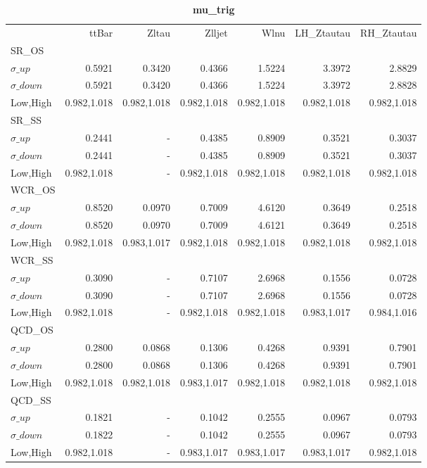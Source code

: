 \documentclass[11pt,oneside,a4paper]{article}
\begin{document}
\begin{table}
\caption{\bf{mu\_trig}}
\centering
\begin{tabular}{lrrrrrr}
& ttBar & Zltau & Zlljet & Wlnu & LH\_Ztautau & RH\_Ztautau \\
SR\_OS &  &  &  &  &  &  \\
$\sigma\_up$ & 0.5921 & 0.3420 & 0.4366 & 1.5224 & 3.3972 & 2.8829 \\
$\sigma\_down$ & 0.5921 & 0.3420 & 0.4366 & 1.5224 & 3.3972 & 2.8828 \\
Low,High & 0.982,1.018 & 0.982,1.018 & 0.982,1.018 & 0.982,1.018 & 0.982,1.018 & 0.982,1.018 \\

\hline
SR\_SS &  &  &  &  &  &  \\
$\sigma\_up$ & 0.2441 & - & 0.4385 & 0.8909 & 0.3521 & 0.3037 \\
$\sigma\_down$ & 0.2441 & - & 0.4385 & 0.8909 & 0.3521 & 0.3037 \\
Low,High & 0.982,1.018 & - & 0.982,1.018 & 0.982,1.018 & 0.982,1.018 & 0.982,1.018 \\

\hline
WCR\_OS &  &  &  &  &  &  \\
$\sigma\_up$ & 0.8520 & 0.0970 & 0.7009 & 4.6120 & 0.3649 & 0.2518 \\
$\sigma\_down$ & 0.8520 & 0.0970 & 0.7009 & 4.6121 & 0.3649 & 0.2518 \\
Low,High & 0.982,1.018 & 0.983,1.017 & 0.982,1.018 & 0.982,1.018 & 0.982,1.018 & 0.982,1.018 \\

\hline
WCR\_SS &  &  &  &  &  &  \\
$\sigma\_up$ & 0.3090 & - & 0.7107 & 2.6968 & 0.1556 & 0.0728 \\
$\sigma\_down$ & 0.3090 & - & 0.7107 & 2.6968 & 0.1556 & 0.0728 \\
Low,High & 0.982,1.018 & - & 0.982,1.018 & 0.982,1.018 & 0.983,1.017 & 0.984,1.016 \\

\hline
QCD\_OS &  &  &  &  &  &  \\
$\sigma\_up$ & 0.2800 & 0.0868 & 0.1306 & 0.4268 & 0.9391 & 0.7901 \\
$\sigma\_down$ & 0.2800 & 0.0868 & 0.1306 & 0.4268 & 0.9391 & 0.7901 \\
Low,High & 0.982,1.018 & 0.982,1.018 & 0.983,1.017 & 0.982,1.018 & 0.982,1.018 & 0.982,1.018 \\

\hline
QCD\_SS &  &  &  &  &  &  \\
$\sigma\_up$ & 0.1821 & - & 0.1042 & 0.2555 & 0.0967 & 0.0793 \\
$\sigma\_down$ & 0.1822 & - & 0.1042 & 0.2555 & 0.0967 & 0.0793 \\
Low,High & 0.982,1.018 & - & 0.983,1.017 & 0.983,1.017 & 0.983,1.017 & 0.982,1.018 \\
\end{tabular}
\end{table}
\end{document}
